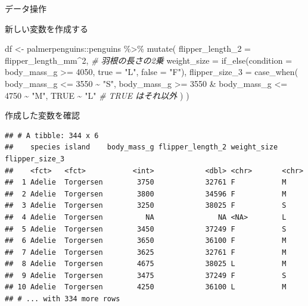 \documentclass[
  ignorenonframetext,
]{beamer}
\newenvironment{Shaded}{\begin{snugshade}}{\end{snugshade}}
\newcommand{\AttributeTok}[1]{\textcolor[rgb]{0.77,0.63,0.00}{#1}}
\newcommand{\CommentTok}[1]{\textcolor[rgb]{0.56,0.35,0.01}{\textit{#1}}}
\newcommand{\ConstantTok}[1]{\textcolor[rgb]{0.00,0.00,0.00}{#1}}
\newcommand{\DecValTok}[1]{\textcolor[rgb]{0.00,0.00,0.81}{#1}}
\newcommand{\FunctionTok}[1]{\textcolor[rgb]{0.00,0.00,0.00}{#1}}
\newcommand{\NormalTok}[1]{#1}
\newcommand{\OtherTok}[1]{\textcolor[rgb]{0.56,0.35,0.01}{#1}}
\newcommand{\SpecialCharTok}[1]{\textcolor[rgb]{0.00,0.00,0.00}{#1}}
\newcommand{\StringTok}[1]{\textcolor[rgb]{0.31,0.60,0.02}{#1}}
\begin{document}
\begin{frame}[fragile]{データ操作}
\begin{block}{新しい変数を作成する}
\begin{Shaded}
\begin{Highlighting}[]
\NormalTok{df }\OtherTok{\textless{}{-}}\NormalTok{ palmerpenguins}\SpecialCharTok{::}\NormalTok{penguins }\SpecialCharTok{\%\textgreater{}\%}
  \FunctionTok{mutate}\NormalTok{(}
    \AttributeTok{flipper\_length\_2 =}\NormalTok{ flipper\_length\_mm}\SpecialCharTok{\^{}}\DecValTok{2}\NormalTok{, }\CommentTok{\# 羽根の長さの2乗}
    \AttributeTok{weight\_size =} \FunctionTok{if\_else}\NormalTok{(}\AttributeTok{condition =}\NormalTok{ body\_mass\_g }\SpecialCharTok{\textgreater{}=} \DecValTok{4050}\NormalTok{, }\AttributeTok{true =} \StringTok{"L"}\NormalTok{, }\AttributeTok{false =} \StringTok{"F"}\NormalTok{),}
    \AttributeTok{flipper\_size\_3 =} \FunctionTok{case\_when}\NormalTok{(}
\NormalTok{      body\_mass\_g }\SpecialCharTok{\textless{}=} \DecValTok{3550} \SpecialCharTok{\textasciitilde{}} \StringTok{"S"}\NormalTok{,}
\NormalTok{      body\_mass\_g }\SpecialCharTok{\textgreater{}=} \DecValTok{3550} \SpecialCharTok{\&}\NormalTok{ body\_mass\_g }\SpecialCharTok{\textless{}=} \DecValTok{4750} \SpecialCharTok{\textasciitilde{}} \StringTok{"M"}\NormalTok{,}
      \ConstantTok{TRUE} \SpecialCharTok{\textasciitilde{}} \StringTok{"L"} \CommentTok{\# TRUE はそれ以外}
\NormalTok{    )}
\NormalTok{  )}
\end{Highlighting}
\end{Shaded}
\end{block}

\begin{block}{作成した変数を確認}
\protect\hypertarget{ux4f5cux6210ux3057ux305fux5909ux6570ux3092ux78baux8a8d}{}
\begin{verbatim}
## # A tibble: 344 x 6
##    species island    body_mass_g flipper_length_2 weight_size flipper_size_3
##    <fct>   <fct>           <int>            <dbl> <chr>       <chr>         
##  1 Adelie  Torgersen        3750            32761 F           M             
##  2 Adelie  Torgersen        3800            34596 F           M             
##  3 Adelie  Torgersen        3250            38025 F           S             
##  4 Adelie  Torgersen          NA               NA <NA>        L             
##  5 Adelie  Torgersen        3450            37249 F           S             
##  6 Adelie  Torgersen        3650            36100 F           M             
##  7 Adelie  Torgersen        3625            32761 F           M             
##  8 Adelie  Torgersen        4675            38025 L           M             
##  9 Adelie  Torgersen        3475            37249 F           S             
## 10 Adelie  Torgersen        4250            36100 L           M             
## # ... with 334 more rows
\end{verbatim}
\end{block}


\end{frame}
\end{document}
